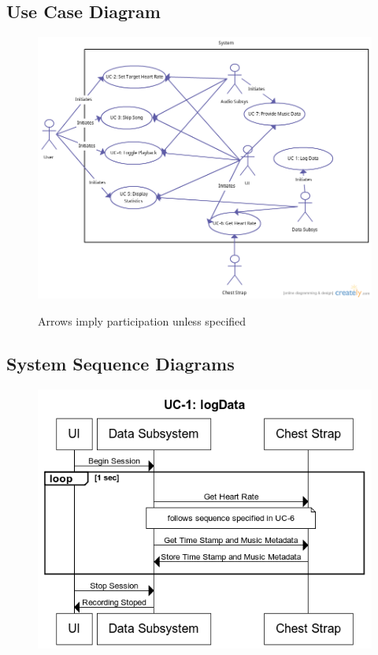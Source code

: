 \documentclass[letterpaper,english, 12pt]{scrreprt}
\begin{document}
\subsection{Use Case Diagram}
\begin{figure}[H]
	\centering
	\includegraphics[width=\textwidth]{img/use_case.png}\\
    \caption{Arrows imply participation unless specified}
\end{figure}

\subsection{System Sequence Diagrams}
\begin{figure}[H]
        \centering
        \includegraphics[width=\textwidth]{img/ssd/ssd_uc1.png}\\
\end{figure}
\end{document}
